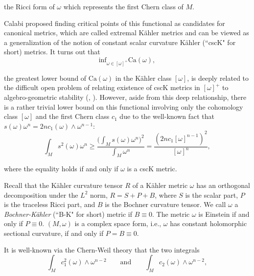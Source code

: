 \documentclass[11pt]{amsart}
\theoremstyle{definition}
\theoremstyle{remark}
\numberwithin{equation}{section}
\begin{document}
the Ricci form of $\omega$ which represents the first Chern class of
$M$.

Calabi proposed finding critical points of this functional as
candidates for canonical metrics, which are called extremal
K\"{a}hler metrics and can be viewed as a generalization of the
notion of constant scalar curvature K\"{a}hler (``cscK" for short)
metrics. It turns out that
$$\text{inf}_{\omega\in[\omega]^{+}}\text{Ca}(\omega),$$

 the greatest
lower bound of $\text{Ca}(\omega)$ in the K\"{a}hler class
$[\omega]$, is deeply related to the difficult open problem of
relating existence of cscK metrics in $[\omega]^{+}$ to
algebro-geometric stability (\cite{Do}, \cite{Ch}). However, aside
from this deep relationship, there is a rather trivial lower bound
on this functional involving only the cohomology class $[\omega]$
and the first Chern class $c_1$ due to the well-known fact that
$s(\omega)\omega^n=2nc_1(\omega)\wedge\omega^{n-1}$:
\begin{equation}\label{inequalitycsc}\int_Ms^2(\omega)\omega^n\geq
\frac{\big(\int_Ms(\omega)\omega^n\big)^2}{\int_M\omega^n}=\frac{(2n
c_1[\omega]^{n-1})^2}{[\omega]^n},\end{equation}

 where the equality holds if and only if $\omega$ is a cscK metric.

Recall that the K\"{a}hler curvature tensor $R$ of a K\"{a}hler
metric $\omega$ has an orthogonal decomposition under the $L^2$
norm, $R=S+P+B$, where $S$ is the scalar part, $P$ is the traceless
Ricci part, and $B$ is the Bochner curvature tensor. We call
$\omega$ a \emph{Bochner-K\"{a}hler} (``B-K" for short) metric if
$B\equiv0$. The metric $\omega$ is Einstein if and only if
$P\equiv0$. $(M,\omega)$ is a complex space form, i.e., $\omega$ has
constant holomorphic sectional curvature, if and only if
$P=B\equiv0$.

It is well-known via the Chern-Weil theory that the two integrals
\begin{equation}\label{ingegral}\int_Mc_1^2(\omega)\wedge\omega^{n-2}\qquad
\text{and} \qquad\int_Mc_2(\omega)\wedge\omega^{n-2},\end{equation}
\end{document}
